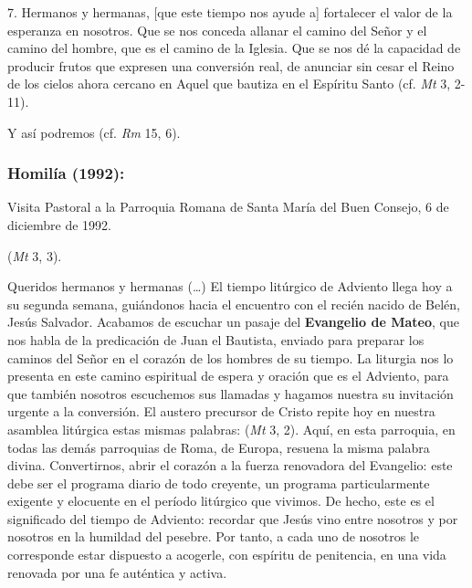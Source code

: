 \begin{body}
\begin{body}
		7. Hermanos y hermanas, {[}que este tiempo nos ayude a{]} fortalecer el valor de la esperanza en nosotros. Que se nos conceda allanar el camino del Señor y el camino del hombre, que es el camino de la Iglesia. Que se nos dé la capacidad de producir frutos que expresen una conversión real, de anunciar sin cesar el Reino de los cielos ahora cercano en Aquel que bautiza en el Espíritu Santo (cf. \emph{Mt} 3, 2-11).

		Y así podremos  (cf. \emph{Rm} 15, 6).
	\end{body}

	\subsubsection{Homilía (1992):}

	Visita Pastoral a la Parroquia Romana de Santa María del Buen Consejo, 6 de diciembre de 1992.

	\begin{body}
		 (\emph{Mt} 3, 3).

		Queridos hermanos y hermanas (\ldots{}) El tiempo litúrgico de Adviento llega hoy a su segunda semana, guiándonos hacia el encuentro con el recién nacido de Belén, Jesús Salvador. Acabamos de escuchar un pasaje del \textbf{Evangelio de Mateo}, que nos habla de la predicación de Juan el Bautista, enviado para preparar los caminos del Señor en el corazón de los hombres de su tiempo. La liturgia nos lo presenta en este camino espiritual de espera y oración que es el Adviento, para que también nosotros escuchemos sus llamadas y hagamos nuestra su invitación urgente a la conversión. El austero precursor de Cristo repite hoy en nuestra asamblea litúrgica estas mismas palabras:  (\emph{Mt} 3, 2). Aquí, en esta parroquia, en todas las demás parroquias de Roma, de Europa, resuena la misma palabra divina. Convertirnos, abrir el corazón a la fuerza renovadora del Evangelio: este debe ser el programa diario de todo creyente, un programa particularmente exigente y elocuente en el período litúrgico que vivimos. De hecho, este es el significado del tiempo de Adviento: recordar que Jesús vino entre nosotros y por nosotros en la humildad del pesebre. Por tanto, a cada uno de nosotros le corresponde estar dispuesto a acogerle, con espíritu de penitencia, en una vida renovada por una fe auténtica y activa.


\end{body}
\end{body}
